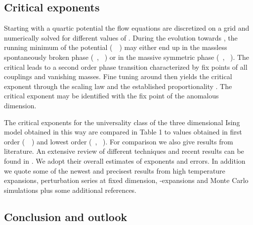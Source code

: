\documentclass[a4paper,aps,prl,twocolumn,groupedaddress]{revtex4}
\begin{document}
\newpage
\subsection*{Critical exponents}

\noindent
Starting with a quartic potential \coordHE{} 
the flow equations are discretized on a grid and numerically solved for different values of 
\myHighlight{$ \kappa_\Lambda $}\coordHE{}. During the evolution towards \coordHE{}, the running minimum of the
potential (~\coordHE{}~) may either end up in the massless spontaneously broken phase 
(~\coordHE{}, \myHighlight{$\kappa \to \infty $}\coordHE{}~) or in the massive symmetric phase (~\coordHE{}, \coordHE{}~). 
The critical \coordHE{} leads to a second order phase transition characterized by fix points 
of all couplings and vanishing masses. Fine tuning \myHighlight{$ \kappa_\Lambda $}\coordHE{} around \coordHE{} then
yields the critical exponent \myHighlight{$ \nu $}\coordHE{} through the scaling law \coordHE{}
and the established proportionality \coordHE{}.
The critical exponent \myHighlight{$ \eta $}\coordHE{} may be identified with the fix point \myHighlight{$ \eta^* $}\coordHE{} of the anomalous 
dimension. %

\bigskip
\noindent
The critical exponents for the universality class of the three dimensional Ising model
obtained in this way are compared in Table 1 to values obtained in first order (~\coordHE{}~)
and lowest order (~\coordHE{}, \coordHE{}~). For comparison we also give results from literature. 
An extensive review of different techniques and recent results can be found in \cite{Lit7}.
We adopt their overall estimates of exponents and errors. In addition we quote some of the 
newest and precisest results from high temperature expansions, perturbation series at fixed 
dimension, \myHighlight{$\epsilon$}\coordHE{}-expansions and Monte Carlo simulations plus some additional references.

\subsection*{Conclusion and outlook}
\end{document}
